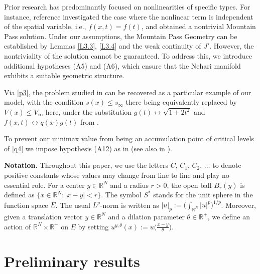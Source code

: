 \documentclass[reqno]{amsart}
\begin{document}
Prior research has predominantly focused on nonlinearities of specific types. 
For instance, reference \cite{shen} investigated the case where the nonlinear term is independent 
of the spatial variable, i.e., $f(x,t)=f(t)$, and obtained  a nontrivial Mountain Pass solution.  
Under our assumptions,  the Mountain Pass Geometry can be established by Lemmas \ref{L3.3}, 
\ref{L3.4} and the weak continuity of $J'$. However, the nontriviality of the solution cannot be 
guaranteed. To address this, we introduce additional hypotheses (A5) and (A6), which ensure that the Nehari manifold exhibits a suitable geometric structure.

Via \eqref{p3}, the problem studied in \cite{fang3} can be recovered as a particular example of 
our model, with the condition $s(x)\leq s_\infty$ there being equivalently replaced by 
$V(x)\leq V_\infty$ here, under the  substitution $g(t)\longleftrightarrow \sqrt{1+2t^2}$ and 
$f(x,t)\longleftrightarrow q(x)g(t)$ from \cite{fang3}.

\begin{remark}\label{r5} \rm
To prevent our minimax value from being an accumulation point of critical levels of 
\eqref{q4} we impose hypothesis (A12) as in \cite{Ambrosetti} (see also in \cite{Carriao}). 
\end{remark}


\noindent\textbf{Notation.} 
Throughout this paper, we use the letters \(C\), \(C_1\), \(C_2\), $\ldots$ to denote positive constants whose values may change from line to line and play no essential role. 
For a center \(y \in \mathbb{R}^N\) and a radius \(r > 0\), the open ball \(B_r(y)\) is defined as 
\(\{x \in \mathbb{R}^N : |x - y| < r\}\). The symbol \(S^*\) stands for the unit sphere in the function 
space \(E\). The usual \(L^p\)-norm is written as 
\(|u|_p := \bigl(\int_{\mathbb{R}^N} |u|^p\bigr)^{1/p}\). Moreover, given a translation vector 
\(y \in \mathbb{R}^N\) and a dilation parameter \(\theta \in \mathbb{R}^+\), we define an action of 
\(\mathbb{R}^N \times \mathbb{R}^+\) on \(E\) by setting 
\(u^{y,\theta}(x) := u\bigl(\frac{x-y}{\theta}\bigr)\).

\section{Preliminary results} \label{s2}
\end{document}
